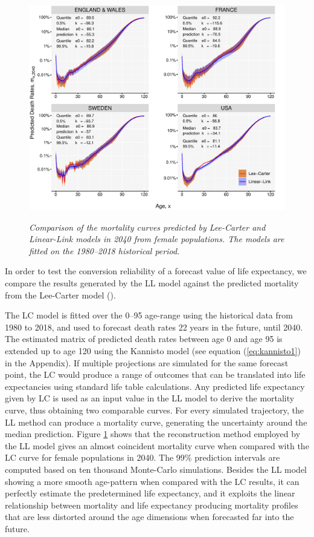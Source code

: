 \documentclass[risks,article,submit,moreauthors,pdftex]{Definitions/mdpi}
\begin{document}
\begin{figure}[!t]

{\centering \includegraphics[width=1\linewidth]{Figure7-1}}

\caption{\textit{Comparison of the mortality curves predicted by Lee-Carter and Linear-Link models in 2040 from female populations. The models are fitted on the 1980--2018 historical period.}}\label{fig:Figure7}
\end{figure}

In order to test the conversion reliability of a forecast value of life expectancy, we compare the results generated by the LL model against the predicted mortality from the Lee-Carter model (\citeyear{lee1992}). 

The LC model is fitted over the 0--95 age-range using the historical data from 1980 to 2018, and used to forecast death rates 22 years in the future, until 2040. The estimated matrix of predicted death rates between age 0 and age 95 is extended up to age 120 using the Kannisto model (see equation (\ref{eq:kannisto1}) in the Appendix). If multiple projections are simulated for the same forecast point, the LC would produce a range of outcomes that can be translated into life expectancies using standard life table calculations. Any predicted life expectancy given by LC is used as an input value in the LL model to derive the mortality curve, thus obtaining two comparable curves. For every simulated trajectory, the LL method can produce a mortality curve, generating the uncertainty around the median prediction. Figure \ref{fig:Figure7} shows that the reconstruction method employed by the LL model gives an almost coincident mortality curve when compared with the LC curve for female populations in 2040. The 99\% prediction intervals are computed based on ten thousand Monte-Carlo simulations. Besides the LL model showing a more smooth age-pattern when compared with the LC results, it can perfectly estimate the predetermined life expectancy, and it exploits the linear relationship between mortality and life expectancy producing mortality profiles that are less distorted around the age dimensions when forecasted far into the future.  
\end{document}
